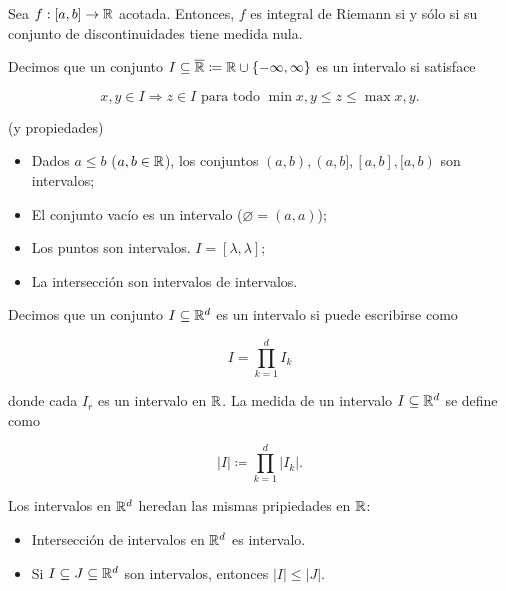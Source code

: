 \documentclass[a4paper]{report}
\begin{document}
	\begin{theorem}
		Sea $f:[a,b]\to\mathbb{R}$ acotada. Entonces, $f$ es integral de Riemann si y sólo si su conjunto de discontinuidades tiene medida nula.
	\end{theorem}

	\begin{definition}[intervalo]
		Decimos que un conjunto $I\subseteq\overline{\mathbb{R}}\coloneq\mathbb{R}\cup \{-\infty,\infty\}$ es un intervalo si satisface

		\[
		x,y\in I \Rightarrow z\in I \text{ para todo } \min x,y\leq z\leq\max x,y.
		\]
	\end{definition}

	\begin{eg}
		(y propiedades)
		\begin{itemize}
			\item Dados $a\leq b$ ($a,b\in\mathbb{R}$), los conjuntos $(a,b),(a,b],[a,b],[a,b)$ son intervalos;

			\item El conjunto vacío es un intervalo ($\varnothing = (a,a)$);

			\item Los puntos son intervalos. $I = [\lambda,\lambda]$;

			\item La intersección son intervalos de intervalos.
		\end{itemize}
	\end{eg}

	\begin{definition}
		Decimos que un conjunto $I\subseteq\mathbb{R}^d$ es un intervalo si puede escribirse como

		\[
		I=\prod_{k=1}^{d} I_k
		\]

		donde cada $I_r$ es un intervalo en $\mathbb{R}$. La medida de un intervalo $I\subseteq\mathbb{R}^d$ se define como
		
		\[
		|I|\coloneq\prod_{k=1}^{d} |I_k|.
		\]
	\end{definition}

	\begin{note}
		Los intervalos en $\mathbb{R}^d$ heredan las mismas pripiedades en $\mathbb{R}$:

		\begin{itemize}
			\item Intersección de intervalos en $\mathbb{R}^d$ es intervalo.

			\item Si $I\subseteq J\subseteq\mathbb{R}^d$ son intervalos, entonces $|I|\leq|J|$.
		\end{itemize}
	\end{note}
\end{document}
